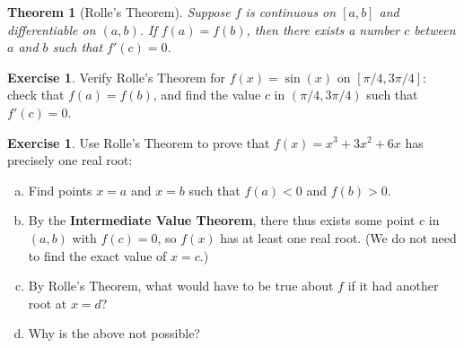 \documentclass[11pt,reqno,final]{amsart}
\numberwithin{figure}{section}
\newtheorem{theorem}[equation]{Theorem}%
\theoremstyle{definition} %
\newtheorem{exercise}[question]{Exercise}
\begin{document}
\newpage

\begin{theorem}[Rolle's Theorem]
        Suppose $f$ is continuous on $[a,b]$ and differentiable on $(a,b)$.
        If $f(a) = f(b)$, then there exists a number $c$ between $a$ and $b$ such that $f'(c) = 0$.
\end{theorem}
 
\begin{exercise}
        Verify Rolle's Theorem for $f(x) = \sin(x)$ on $[\pi/4,3\pi/4]$:
        check that $f(a) = f(b)$, and find the value $c$ in $(\pi/4,3\pi/4)$ such that $f'(c) = 0$.
        \vfill
\end{exercise}

\begin{exercise}
        Use Rolle's Theorem to prove that $f(x) = x^3+3x^2+6x$ has precisely one real root:
        \begin{enumerate}[(a)]
        \item Find points $x = a$ and $x=b$ such that $f(a) < 0$ and $f(b) > 0$.
                \vfill
        \item By the \textbf{Intermediate Value Theorem}, there thus exists some point $c$ in $(a,b)$ with $f(c) = 0$, so
                $f(x)$ has at least one real root.
                (We do not need to find the exact value of $x=c$.)
        \item By Rolle's Theorem, what would have to be true about $f$ if it had another root at $x=d$?
                \vfill
        \item Why is the above not possible?
                \vfill
        \end{enumerate}
\end{exercise}
\end{document}
